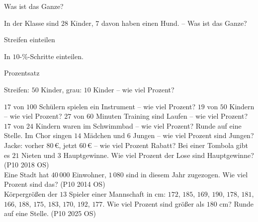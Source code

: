 \setcounter{aufgabe}{11}

\begin{aufgabe}{Was ist das Ganze?}
\begin{teile}
\teil In der Klasse sind $28$ Kinder, $7$ davon haben einen Hund. – Was ist das Ganze?
\end{teile}
\end{aufgabe}

\begin{aufgabe}{Streifen einteilen}
\begin{teile}
\teil In $10$-\%-Schritte einteilen.

\streifenleer[0]
\end{teile}
\end{aufgabe}

\begin{aufgabe}{Prozentsatz}
\begin{teile}
\teil Streifen: $50$ Kinder, grau: $10$ Kinder – wie viel Prozent?

\teil $17$ von $100$ Schülern spielen ein Instrument – wie viel Prozent? \leerfeld[\%]
\teil $19$ von $50$ Kindern – wie viel Prozent? \leerfeld[\%]
\teil $27$ von $60$ Minuten Training sind Laufen – wie viel Prozent? \leerfeld[\%]
\teil $17$ von $24$ Kindern waren im Schwimmbad – wie viel Prozent? Runde auf eine Stelle. \leerfeld[\%]
\teil Im Chor singen $14$ Mädchen und $6$ Jungen – wie viel Prozent sind Jungen? \leerfeld[\%]
\teil Jacke: vorher $80\,€$, jetzt $60\,€$ – wie viel Prozent Rabatt? \leerfeld[\%]
\teil Bei einer Tombola gibt es $21$ Nieten und $3$ Hauptgewinne. Wie viel Prozent der Lose sind Hauptgewinne? \hfill (P10 2018 OS) \\ \leerfeld[\%]
\teil Eine Stadt hat $40\,000$ Einwohner, $1\,080$ sind in diesem Jahr zugezogen. Wie viel Prozent sind das? \hfill (P10 2014 OS) \\ \leerfeld[\%]
\teil Körpergrößen der $13$ Spieler einer Mannschaft in cm: $172$, $185$, $169$, $190$, $178$, $181$, $166$, $188$, $175$, $183$, $170$, $192$, $177$. Wie viel Prozent sind größer als $180$ cm? Runde auf eine Stelle. \hfill (P10 2025 OS)
\end{teile}
\end{aufgabe}

